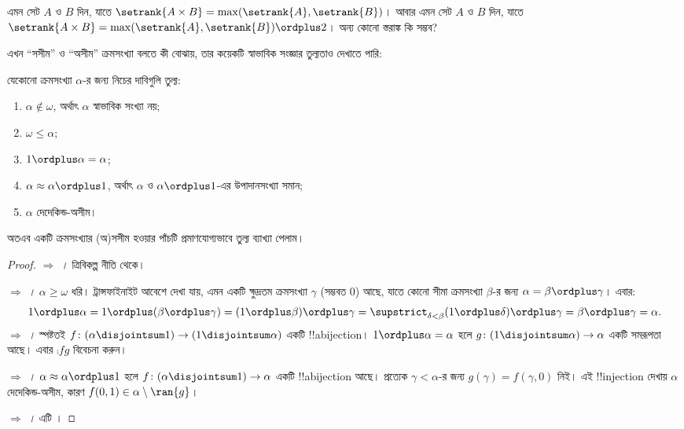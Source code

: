 \documentclass[../../../include/open-logic-section]{subfiles}
\begin{document}
\begin{prob}
এমন সেট $A$ ও $B$ দিন, যাতে $\setrank{A \times B} =
\max(\setrank{A}, \setrank{B})$। আবার এমন সেট
$A$ ও $B$ দিন, যাতে
$\setrank{A \times B}=\max(\setrank{A}, \setrank{B})
\ordplus 2$। অন্য কোনো স্তরাঙ্ক কি সম্ভব?
\end{prob}

এখন ``সসীম'' ও ``অসীম'' ক্রমসংখ্যা বলতে কী বোঝায়,
তার কয়েকটি স্বাভাবিক সংজ্ঞার তুল্যতাও দেখাতে পারি:

\begin{lem}
যেকোনো ক্রমসংখ্যা $\alpha$-র জন্য নিচের দাবিগুলি তুল্য:
\begin{enumerate}
	\item{} $\alpha\notin \omega$,
	অর্থাৎ $\alpha$ স্বাভাবিক সংখ্যা নয়;
	\item{} $\omega \leq \alpha$;
	\item{} $1 \ordplus \alpha = \alpha$;
	\item{} $\alpha \approx \alpha\ordplus 1$,
	অর্থাৎ $\alpha$ ও $\alpha\ordplus 1$-এর উপাদানসংখ্যা সমান;
	\item{} $\alpha$ দেদেকিন্ড-অসীম।
\end{enumerate}
\end{lem}
\noindent
অতএব একটি ক্রমসংখ্যার (অ)সসীম হওয়ার পাঁচটি
প্রমাণযোগ্যভাবে তুল্য ব্যাখ্যা পেলাম।

\begin{proof}
\emph{ $\Rightarrow$
।} ত্রিবিকল্প নীতি থেকে।

\emph{ $\Rightarrow$
।} $\alpha \geq \omega$ ধরি।
ট্রান্সফাইনাইট আবেশে দেখা যায়, এমন একটি ক্ষুদ্রতম
ক্রমসংখ্যা $\gamma$ (সম্ভবত $0$) আছে, যাতে কোনো
সীমা ক্রমসংখ্যা $\beta$-র জন্য
$\alpha = \beta \ordplus \gamma$। এবার:
\[
	1 \ordplus \alpha =
	1 \ordplus (\beta \ordplus \gamma) =
	(1 \ordplus \beta) \ordplus \gamma =
	\supstrict_{\delta < \beta} (1 \ordplus \delta) \ordplus \gamma =
	\beta \ordplus \gamma =
	\alpha.
\]
\emph{ $\Rightarrow$
।} স্পষ্টতই
$f \colon (\alpha \disjointsum 1) \to
(1 \disjointsum \alpha)$ একটি !!a{bijection}।
$1 \ordplus \alpha = \alpha$ হলে
$g \colon (1 \disjointsum \alpha) \to \alpha$
একটি সমরূপতা আছে। এবার $\comp{f}{g}$ বিবেচনা করুন।

\emph{ $\Rightarrow$
।} $\alpha \approx \alpha \ordplus 1$
হলে $f \colon (\alpha \disjointsum 1) \to \alpha$
একটি !!a{bijection} আছে। প্রত্যেক $\gamma < \alpha$-র
জন্য $g(\gamma) = f(\gamma, 0)$ নিই। এই
!!{injection} দেখায় $\alpha$ দেদেকিন্ড-অসীম,
কারণ $f(0,1) \in \alpha \setminus \ran{g}$।

\emph{ $\Rightarrow$
।} এটি
।
\end{proof}
\end{document}
